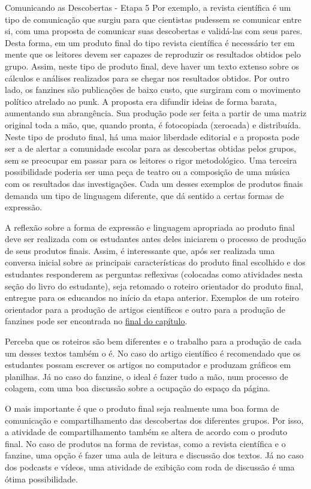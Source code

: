 \begin{paginatexto}{Comunicando as Descobertas - Etapa 5}
Por exemplo, a revista científica é um tipo de comunicação que surgiu para que cientistas pudessem se comunicar entre si, com uma proposta de comunicar suas descobertas e validá-las com seus pares. Desta forma, em um produto final do tipo revista científica é necessário ter em mente que os leitores devem ser capazes de reproduzir os resultados obtidos pelo grupo. Assim, neste tipo de produto final, deve haver um texto extenso sobre os cálculos e análises realizados para se chegar nos resultados obtidos. Por outro lado, os fanzines são publicações de baixo custo, que surgiram com o movimento político atrelado ao punk. A proposta era difundir ideias de forma barata, aumentando sua abrangência. Sua produção pode ser feita a partir de uma matriz original toda a mão, que, quando pronta, é fotocopiada (xerocada) e distribuída. Neste tipo de produto final, há uma maior liberdade editorial e a proposta pode ser a de alertar a comunidade escolar para as descobertas obtidas pelos grupos, sem se preocupar em passar para os leitores o rigor metodológico. Uma terceira possibilidade poderia ser uma peça de teatro ou a composição de uma música com os resultados das investigações. Cada um desses exemplos de produtos finais demanda um tipo de linguagem diferente, que dá sentido a certas formas de expressão. 

A reflexão sobre a forma de expressão e linguagem apropriada ao produto final deve ser realizada com os estudantes antes deles iniciarem o processo de produção de seus produtos finais. Assim, é interessante que, após ser realizada uma conversa inicial sobre as principais características do produto final escolhido e dos estudantes responderem as perguntas reflexivas (colocadas como atividades nesta seção do livro do estudante), seja retomado o roteiro orientador do produto final, entregue para os educandos no início da etapa anterior. Exemplos de um roteiro orientador para a produção de artigos científicos e outro para a produção de fanzines pode ser encontrada no \hyperref[roteiro-artigo]{final do capítulo}. 

Perceba que os roteiros são bem diferentes e o trabalho para a produção de cada um desses textos também o é. No caso do artigo científico é recomendado que os estudantes possam escrever os artigos no computador e produzam gráficos em planilhas. Já no caso do fanzine, o ideal é fazer tudo a mão, num processo de colagem, com uma boa discussão sobre a ocupação do espaço da página. 

O mais importante é que o produto final seja realmente uma boa forma de comunicação e compartilhamento das descobertas dos diferentes grupos. Por isso, a atividade de compartilhamento também se altera de acordo com o produto final. No caso de produtos na forma de revistas, como a revista científica e o fanzine, uma opção é fazer uma aula de leitura e discussão dos textos. Já no caso dos podcasts e vídeos, uma atividade de exibição com roda de discussão é uma ótima possibilidade. 
\clearpage
\end{paginatexto}

